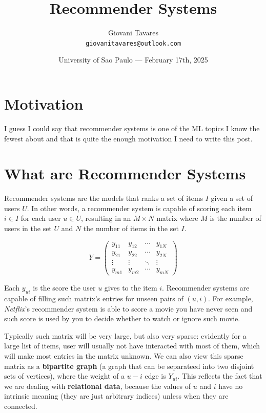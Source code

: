\documentclass{article}
\title{Recommender Systems} %
\author{Giovani Tavares\\ \texttt{giovanitavares@outlook.com}} %
\date{University of Sao Paulo --- February 17th, 2025} %
\begin{document}
\maketitle %


\section*{Motivation} %

I guess I could say that recommender systems is one of the ML topics I know the fewest about and that is quite the enough motivation I need to write this post.



\section{What are Recommender Systems}

Recommender systems are the models that ranks a set of items $I$ given a set of users $U$. In other words, a recommender system is capable of scoring each item $i \in I$ for each user $u \in U$, resulting in an $M \times N$ matrix where $M$ is the number of users in the set $U$ and $N$ the number of items in the set $I$.

\[
Y = \begin{pmatrix}
	y_{11} & y_{12} & \cdots & y_{1N} \\
	y_{21} & y_{22} & \cdots & y_{2N} \\
	\vdots & \vdots & \ddots & \vdots \\
	y_{m1} & y_{m2} & \cdots & y_{mN}
\end{pmatrix}
\]

Each $y_{ui}$ is the score the user $u$ gives to the item $i$. Recommender systems are capable of filling such matrix's entries for unseen pairs of $(u,i)$. For example, \textit{Netflix}'s recommender system is able to score a movie you have never seen and such score is used by you to decide whether to watch or ignore such movie.

Typically such matrix will be very large, but also very sparse: evidently for a large list of items, user will usually not have interacted with most of them, which will make most entries in the matrix unknown. We can also view this sparse matrix as a \textbf{bipartite graph} (a graph that can be separateed into two disjoint sets of vertices), where the weight of a $u - i $ edge is $Y_{ui}$. This reflects the fact that we are dealing with \textbf{relational data}, because the values of $u$ and $i$ have no intrinsic meaning (they are just arbitrary indices) unless when they are connected.
\end{document}
